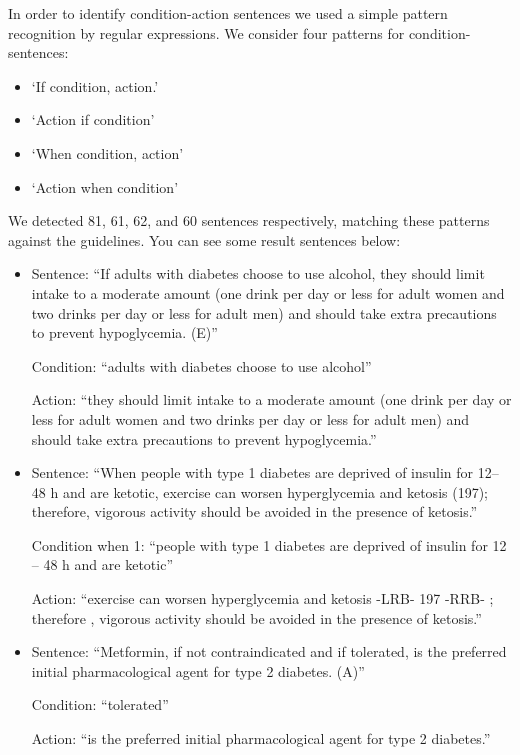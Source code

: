 \documentclass[12pt,letterpaper]{article}
\begin{document}
In order to identify condition-action sentences we used a simple pattern recognition by regular expressions. We consider four patterns for condition-sentences: 
\begin{itemize}
	\item `If condition, action.'
	\item `Action if condition'
	\item `When condition, action'
	\item `Action when condition'
\end{itemize}
We detected 81, 61, 62, and 60 sentences respectively, matching these patterns against the guidelines. You can see some result sentences below:

\begin{itemize}
\item Sentence: ``If adults with diabetes choose to use alcohol, they should limit intake to a moderate amount (one drink per day or less for adult women and two drinks per  day or less for  adult men) and should take extra precautions to prevent hypoglycemia. (E)''

Condition: ``adults with diabetes choose to use alcohol''

Action: ``they should limit intake to a moderate amount (one drink per day or less for adult women and two drinks per day or less for adult men) and should take extra precautions to prevent hypoglycemia.''

\item Sentence: ``When people with type 1 diabetes are deprived of insulin for 12– 48 h and are ketotic, exercise can worsen hyperglycemia and ketosis (197); therefore, vigorous activity should be avoided in the presence of ketosis.''

Condition when 1: ``people with type 1 diabetes are deprived of insulin for 12 -- 48 h and are ketotic''

Action: ``exercise can worsen hyperglycemia and ketosis -LRB- 197 -RRB- ; therefore , vigorous activity should be avoided in the presence of ketosis.''

\item Sentence: ``Metformin, if not contraindicated and if tolerated, is the preferred initial pharmacological agent for type 2 diabetes. (A)''

Condition: ``tolerated''

Action: ``is the preferred initial pharmacological agent for type 2 diabetes.''
\end{itemize}
\end{document}
